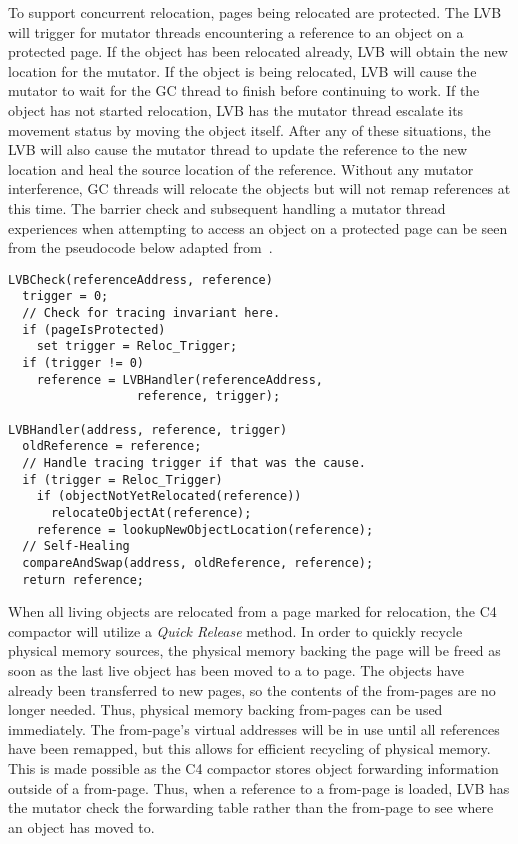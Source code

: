\documentclass{sig-alternate}
\begin{document}
To support concurrent relocation, pages being relocated are protected. 
The LVB will trigger for mutator threads encountering a reference to an object
on a protected page. If the object has been relocated already, LVB will
obtain the new location for the mutator. If the object is being relocated, 
LVB will cause the mutator to wait
for the GC thread to finish before continuing to work.
If the object has not started relocation, LVB has the mutator thread 
escalate its movement status by moving the object itself. After any of 
these situations, the LVB will also cause the mutator thread to update 
the reference to the new location and heal the source location of the reference.
Without any mutator interference, GC threads will relocate the objects but
will not remap references at this time. The barrier check and subsequent
handling a mutator thread experiences when attempting to access an object on a
protected page can be seen from the pseudocode below adapted from~\cite{Tene:C4}.
\begin{verbatim}
LVBCheck(referenceAddress, reference)
  trigger = 0;
  // Check for tracing invariant here.
  if (pageIsProtected)
    set trigger = Reloc_Trigger;
  if (trigger != 0)
    reference = LVBHandler(referenceAddress, 
                  reference, trigger);
    
LVBHandler(address, reference, trigger)
  oldReference = reference;
  // Handle tracing trigger if that was the cause.
  if (trigger = Reloc_Trigger) 
    if (objectNotYetRelocated(reference))
      relocateObjectAt(reference);
    reference = lookupNewObjectLocation(reference);
  // Self-Healing
  compareAndSwap(address, oldReference, reference);
  return reference;
\end{verbatim}
When all living objects are relocated from a page marked for relocation,
the C4 compactor will utilize a \emph{Quick Release} method. In order to quickly recycle
physical memory sources, the physical memory backing the page will be freed
as soon as the last live object has been moved to a to page. The objects have already 
been transferred to new pages, so the contents of the from-pages are no longer needed. Thus,
physical memory backing from-pages can be used immediately. The from-page's virtual 
addresses will be in use until all references have been remapped, but this 
allows for efficient recycling of physical memory. This is made possible as the C4 compactor
stores object forwarding information outside of a from-page. Thus, when a reference to
a from-page is loaded, LVB has the mutator check the forwarding table rather than the
from-page to see where an object has moved to.
\end{document}
